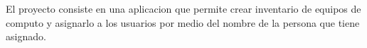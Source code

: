 El proyecto consiste en una aplicacion que permite crear inventario de equipos de computo y asignarlo a los usuarios por medio del nombre de la persona que tiene asignado.